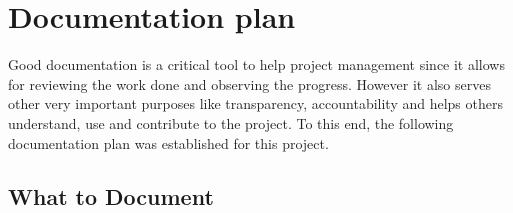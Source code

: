 \section{Documentation plan}
\label{section:documentation_plan}

Good documentation is a critical tool to help project management since it allows for reviewing the work done and observing the progress. However it also serves other very important purposes like transparency, accountability and helps others understand, use and contribute to the project. To this end, the following documentation plan was established for this project.


\begin{comment}
\helper{Plan for how the project’s documentation is to be managed. Example listed below.}

The purpose of a Documentation Plan is to provide a structured framework for creating, storing, reviewing, and disseminating project-related information. It ensures systematic recording and retention of all details, facilitating efficient communication, transparency, accountability, and continuity throughout the project. Comprehensive documentation is a critical tool in project management, aiding in tracking progress, making informed decisions, and providing references for future initiatives. Furthermore, it promotes knowledge sharing and learning during the project and beyond.

The following sections present a detailed example of a Documentation Plan. It outlines what needs to be documented, how and when to do so, who is responsible for various documentation tasks, where the documents will be stored, and the review and approval process for these documents. This example serves as a guide and should be tailored to fit your project's specific needs and circumstances.
\end{comment}

\subsection{What to Document}

